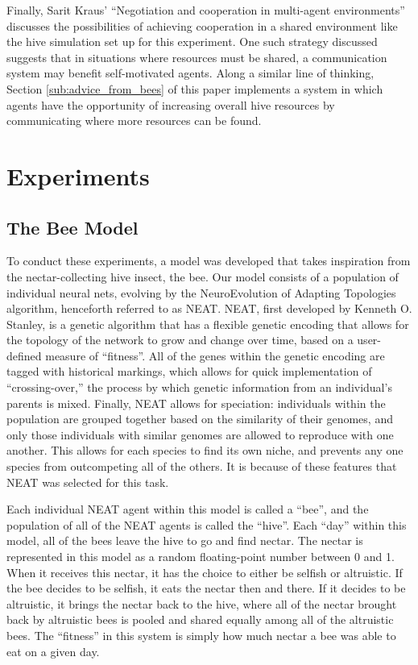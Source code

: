 \documentclass[11pt, letter]{article}
\begin{document}
		Finally, Sarit Kraus' ``Negotiation and cooperation in multi-agent environments'' discusses the possibilities of achieving cooperation in a shared environment like the hive simulation set up for this experiment. \cite{kraus} One such strategy discussed suggests that in situations where resources must be shared, a communication system may benefit self-motivated agents. Along a similar line of thinking, Section \ref{sub:advice_from_bees} of this paper implements a system in which agents have the opportunity of increasing overall hive resources by communicating where more resources can be found. 



	\section{Experiments} %
	\label{sec:experiments}

		\subsection{The Bee Model} %
		\label{sub:the_bee_model}
			To conduct these experiments, a model was developed that takes inspiration from the nectar-collecting hive insect, the bee. Our model consists of a population of individual neural nets, evolving by the NeuroEvolution of Adapting Topologies algorithm, henceforth referred to as NEAT.\cite{neat} NEAT, first developed by Kenneth O. Stanley, is a genetic algorithm that has a flexible genetic encoding that allows for the topology of the network to grow and change over time, based on a user-defined measure of ``fitness''. All of the genes within the genetic encoding are tagged with historical markings, which allows for quick implementation of ``crossing-over,'' the process by which genetic information from an individual's parents is mixed. Finally, NEAT allows for speciation: individuals within the population are grouped together based on the similarity of their genomes, and only those individuals with similar genomes are allowed to reproduce with one another. This allows for each species to find its own niche, and prevents any one species from outcompeting all of the others. It is because of these features that NEAT was selected for this task.

			Each individual NEAT agent within this model is called a ``bee'', and the population of all of the NEAT agents is called the ``hive''. Each ``day'' within this model, all of the bees leave the hive to go and find nectar. The nectar is represented in this model as a random floating-point number between 0 and 1. When it receives this nectar, it has the choice to either be selfish or altruistic. If the bee decides to be selfish, it eats the nectar then and there. If it decides to be altruistic, it brings the nectar back to the hive, where all of the nectar brought back by altruistic bees is pooled and shared equally among all of the altruistic bees. The ``fitness'' in this system is simply how much nectar a bee was able to eat on a given day.
\end{document}
